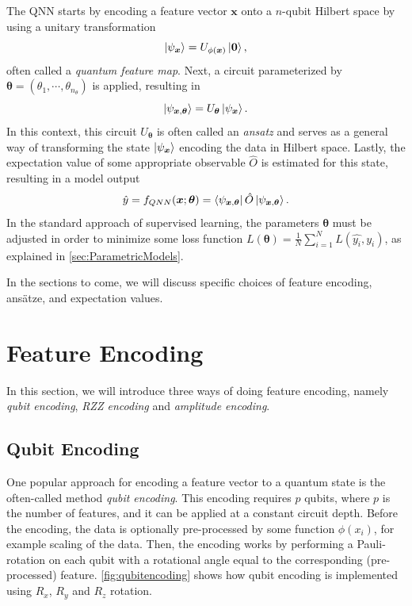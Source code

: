 The QNN starts by encoding a feature vector $\boldsymbol{x}$ onto a $n$-qubit Hilbert space by using a unitary transformation 
\begin{equation}
    \ket{\psi_{\boldsymbol{x}}} = U_{\phi(\boldsymbol{x})}\ket{\boldsymbol{0}},
\end{equation}
often called a \emph{quantum feature map}. Next, a circuit parameterized by $\boldsymbol{\theta} = (\theta_1, \cdots, \theta_{n_{\theta}})$ is applied, resulting in 
\begin{equation}
    \ket{\psi_{\boldsymbol{x}, \boldsymbol{\theta}}} = U_{\boldsymbol{\theta}}\ket{\psi_{\boldsymbol{x}}}.
\end{equation} In this context, this circuit $U_{\boldsymbol{\theta}}$ is often called an \emph{ansatz} and serves as a general way of transforming the state $\ket{\psi_{\boldsymbol{x}}}$ encoding the data in Hilbert space. Lastly, the expectation value of some appropriate observable $\hat{O}$ is estimated for this state, resulting in a model output 
\begin{equation}\label{eq:QNN}
    \hat{y} = f_{QNN}(\boldsymbol{x};\boldsymbol{\theta}) = \bra{\psi_{\boldsymbol{x}, \boldsymbol{\theta}}} \hat{O} \ket{\psi_{\boldsymbol{x}, \boldsymbol{\theta}}}.
\end{equation} In the standard approach of supervised learning, the parameters $\boldsymbol{\theta}$ must be adjusted in order to minimize some loss function $L(\boldsymbol{\theta}) = \frac{1}{N}\sum_{i=1}^N L(\hat{y_i},y_i)$, as explained in \autoref{sec:ParametricModels}. 

In the sections to come, we will discuss specific choices of feature encoding, ansätze, and expectation values.

\section{Feature Encoding}\label{sec:FeatureEncoding}
In this section, we will introduce three ways of doing feature encoding, namely \emph{qubit encoding}, \emph{RZZ encoding} and \emph{amplitude encoding}. 

\subsection{Qubit Encoding}\label{sec:QubitEncoding}
One popular approach for encoding a feature vector to a quantum state is the often-called method \emph{qubit encoding}\cite{Benedetti_2019}. This encoding requires $p$ qubits, where $p$ is the number of features, and it can be applied at a constant circuit depth. Before the encoding, the data is optionally pre-processed by some function $\phi(x_i)$, for example scaling of the data. Then, the encoding works by performing a Pauli-rotation on each qubit with a rotational angle equal to the corresponding (pre-processed) feature. \autoref{fig:qubitencoding} shows how qubit encoding is implemented using $R_x$, $R_y$ and $R_z$ rotation.

